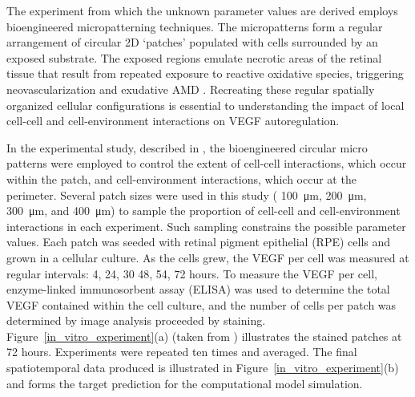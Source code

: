 The experiment from which the unknown parameter values are derived employs bioengineered micropatterning techniques. The micropatterns form a regular arrangement of circular 2D ‘patches’ populated with cells surrounded by an exposed substrate. The exposed regions emulate necrotic areas of the retinal tissue that result from repeated exposure to reactive oxidative species, triggering neovascularization and exudative AMD \cite{Chopdar2003Age}. Recreating these regular spatially organized cellular configurations is essential to understanding the impact of local cell-cell and cell-environment interactions on VEGF autoregulation. 

In the experimental study, described in \cite{qanitabaker:Vargis2014Effect}, the bioengineered circular micro patterns were employed to control the extent of cell-cell interactions, which occur within the patch, and cell-environment interactions, which occur at the perimeter. Several patch sizes were used in this study ( \SI{100}{\micro\metre}, \SI{200}{\micro\metre}, \SI{300}{\micro\metre}, and \SI{400}{\micro\metre}) to sample the proportion of cell-cell and cell-environment interactions in each experiment. Such sampling constrains the possible parameter values. Each patch was seeded with retinal pigment epithelial (RPE) cells and grown in a cellular culture. As the cells grew, the VEGF per cell was measured at regular intervals: 4, 24, 30 48, 54, 72 hours. To measure the VEGF per cell, enzyme-linked immunosorbent assay (ELISA) was used to determine the total VEGF contained within the cell culture, and the number of cells per patch was determined by image analysis proceeded by staining. Figure~\ref{in_vitro_experiment}(a) (taken from \cite{qanitabaker:Vargis2014Effect}) illustrates the stained patches at 72 hours. Experiments were repeated ten times and averaged. The final spatiotemporal data produced is illustrated in Figure~\ref{in_vitro_experiment}(b) and forms the target prediction for the computational model simulation.

